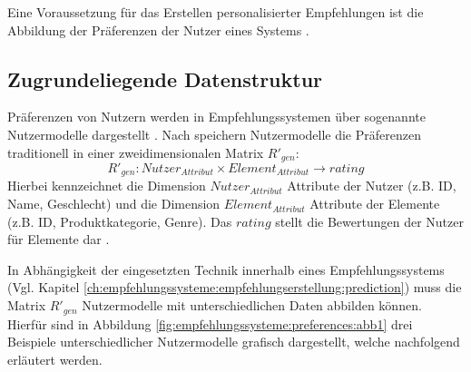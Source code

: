 Eine Voraussetzung für das Erstellen personalisierter Empfehlungen ist die Abbildung der Präferenzen der Nutzer eines Systems \cite[S. 36]{berkovsky:2:article}.

\subsection{Zugrundeliegende Datenstruktur}%
Präferenzen von Nutzern werden in Empfehlungssystemen über sogenannte Nutzermodelle dargestellt \cite[S. 9]{ricci:inbook}\cite[S. 2]{jawaheer:article}\cite[S. 246]{berkovsky:article}.
Nach \textcite[S. 249f.]{berkovsky:article} speichern Nutzermodelle die Präferenzen traditionell in einer zweidimensionalen Matrix $R'_{gen}$:
\begin{equation}\label{eq4}
    R'_{gen}: Nutzer_{Attribut} \times Element_{Attribut} \rightarrow rating
\end{equation}
Hierbei kennzeichnet die Dimension $Nutzer_{Attribut}$ Attribute der Nutzer (z.B. ID, Name, Geschlecht) und die Dimension $Element_{Attribut}$ Attribute der Elemente (z.B. ID, Produktkategorie, Genre).
Das $rating$ stellt die Bewertungen der Nutzer für Elemente dar \cite[S. 250]{berkovsky:article}.

In Abhängigkeit der eingesetzten Technik innerhalb eines Empfehlungssystems (Vgl. Kapitel \ref{ch:empfehlungssysteme:empfehlungserstellung:prediction}) muss die Matrix $R'_{gen}$ Nutzermodelle mit unterschiedlichen Daten abbilden können. %
Hierfür sind in Abbildung \ref{fig:empfehlungssysteme:preferences:abb1} drei Beispiele unterschiedlicher Nutzermodelle grafisch dargestellt, welche nachfolgend erläutert werden.

